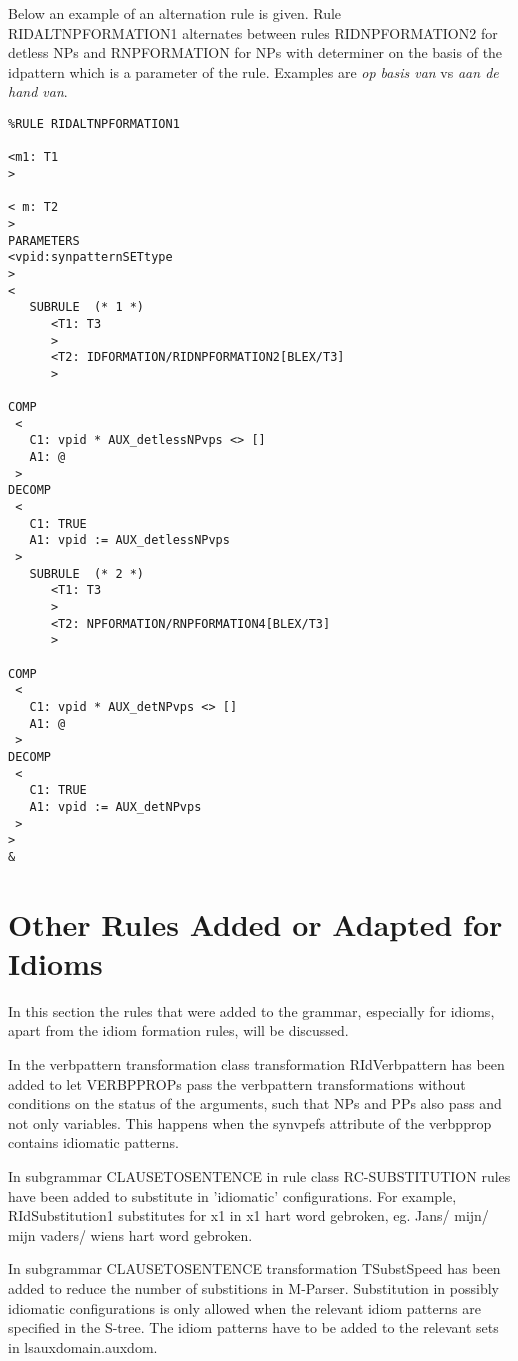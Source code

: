 Below an example of an alternation rule is given.
Rule RIDALTNPFORMATION1 alternates between rules RIDNPFORMATION2 for 
detless NPs and RNPFORMATION for NPs with determiner on the basis of the
idpattern which is a parameter of the rule.
Examples are {\em op basis van} vs {\em aan de hand van}.

\begin{verbatim}
%RULE RIDALTNPFORMATION1

<m1: T1
>

< m: T2
>
PARAMETERS
<vpid:synpatternSETtype
>
<
   SUBRULE  (* 1 *)
      <T1: T3
      >
      <T2: IDFORMATION/RIDNPFORMATION2[BLEX/T3]
      >

COMP
 <
   C1: vpid * AUX_detlessNPvps <> []
   A1: @
 >
DECOMP
 <
   C1: TRUE
   A1: vpid := AUX_detlessNPvps
 >
   SUBRULE  (* 2 *)
      <T1: T3
      >
      <T2: NPFORMATION/RNPFORMATION4[BLEX/T3]
      >

COMP
 <
   C1: vpid * AUX_detNPvps <> []
   A1: @
 >
DECOMP
 <
   C1: TRUE
   A1: vpid := AUX_detNPvps
 >
>
&
\end{verbatim}


\section{Other Rules Added or Adapted for Idioms}
\label{or}

In this section the rules that were added to the grammar, especially for
idioms, apart from the idiom formation rules, will be discussed. 

In the verbpattern transformation class transformation RIdVerbpattern
has been added to let VERBPPROPs pass the
verbpattern transformations without conditions on the status of the arguments, 
such that NPs and PPs also pass and not only variables. This happens when the 
synvpefs attribute of the verbpprop contains idiomatic patterns.

In subgrammar CLAUSETOSENTENCE in rule class RC-SUBSTITUTION rules have been
added to substitute in 'idiomatic' configurations. For example, 
RIdSubstitution1 substitutes for x1 in x1 hart word
gebroken, eg. Jans/ mijn/ mijn vaders/ wiens hart word gebroken. 

In subgrammar CLAUSETOSENTENCE transformation TSubstSpeed has been added to
reduce the number of substitions in M-Parser. Substitution in possibly
idiomatic configurations is only allowed when the relevant idiom patterns are
specified in the S-tree. The idiom patterns have to be added to the relevant
sets in lsauxdomain.auxdom. 

